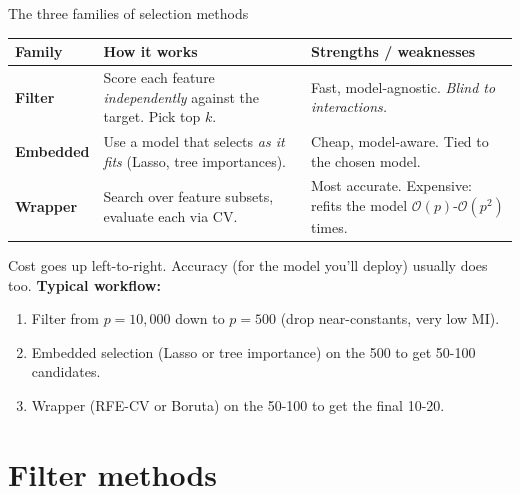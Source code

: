 \documentclass[aspectratio=169]{beamer}
\begin{document}
\begin{frame}{The three families of selection methods}
  \begin{center}\small
    \begin{tabular}{p{2.8cm} p{4.5cm} p{4.5cm}}
      \textbf{Family} & \textbf{How it works} & \textbf{Strengths / weaknesses} \\ \hline
      \textbf{Filter} & Score each feature \emph{independently} against the target. Pick top $k$. & Fast, model-agnostic. \emph{Blind to interactions.} \\[2pt]
      \textbf{Embedded} & Use a model that selects \emph{as it fits} (Lasso, tree importances). & Cheap, model-aware. Tied to the chosen model. \\[2pt]
      \textbf{Wrapper} & Search over feature subsets, evaluate each via CV. & Most accurate. Expensive: refits the model $\mathcal{O}(p)$-$\mathcal{O}(p^2)$ times. \\
    \end{tabular}
  \end{center}
  \vfill
  Cost goes up left-to-right. Accuracy (for the model you'll deploy) usually does too.
  \vfill
  \textbf{Typical workflow:}
  \begin{enumerate}\small
    \item Filter from $p = 10{,}000$ down to $p = 500$ (drop near-constants, very low MI).
    \item Embedded selection (Lasso or tree importance) on the 500 to get 50-100 candidates.
    \item Wrapper (RFE-CV or Boruta) on the 50-100 to get the final 10-20.
  \end{enumerate}
\end{frame}

\section{Filter methods}
\end{document}
